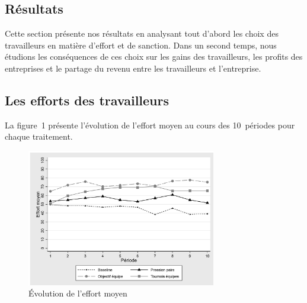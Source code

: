 \begin{Article}
\begin{refsection}[Lebourges]
\section{Résultats}
\label{section:résultats}

Cette section présente nos résultats en analysant tout d'abord les choix
des travailleurs en matière d'effort et de sanction. Dans un second
temps, nous étudions les conséquences de ces choix sur les gains des
travailleurs, les profits des entreprises et le partage du revenu entre
les travailleurs et l'entreprise.

\subsection{Les efforts des travailleurs}

La figure~1 présente l'évolution de l'effort moyen au cours des
10~périodes pour chaque traitement.

\begin{figure}[h]
    \centering
    \caption{Évolution de l'effort moyen}
    \includegraphics[height=6cm]{05_graph1.png}
\end{figure}


\end{refsection}
\end{Article}
